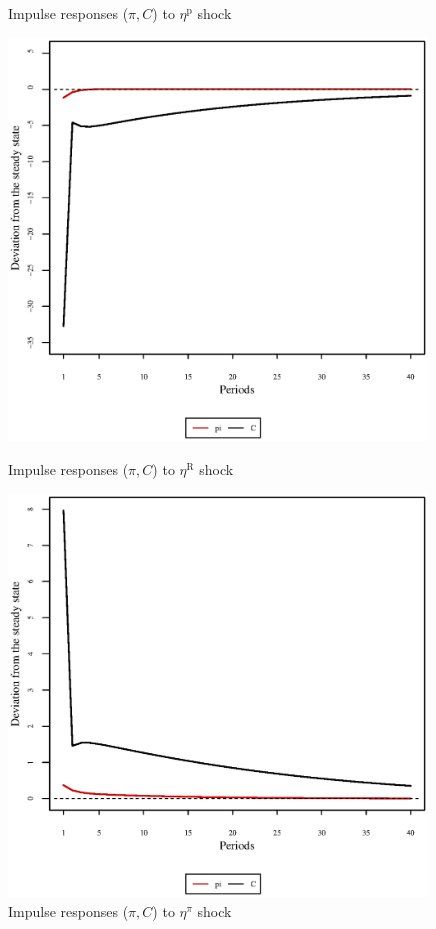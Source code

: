 \begin{figure}[h]
\begin{minipage}{0.5\textwidth}
\caption{Impulse responses ($\pi, C$) to $\eta^{\mathrm{p}}$ shock}
\end{minipage}
\end{figure}

\begin{figure}[h]
\begin{minipage}{0.5\textwidth}
\vspace*{-3em}
\centering
\includegraphics[width=0.99\textwidth, scale=0.55]{plots/plot_83.eps}
\caption{Impulse responses ($\pi, C$) to $\eta^{\mathrm{R}}$ shock}
\end{minipage}
\begin{minipage}{0.5\textwidth}
\vspace*{-3em}
\centering
\includegraphics[width=0.99\textwidth, scale=0.55]{plots/plot_84.eps}
\caption{Impulse responses ($\pi, C$) to $\eta^{\pi}$ shock}
\end{minipage}
\end{figure}

